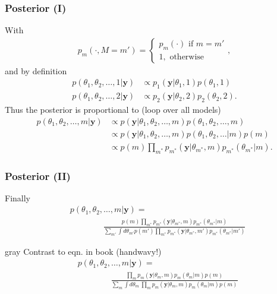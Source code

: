 \documentclass[usenames,dvipsnames,table]{beamer}
\begin{document}
\begin{frame}
\frametitle{Posterior (I)}

With
\begin{align*}
p_m(\cdot, M=m') =
    \begin{cases}
    p_m(\cdot) \text{ if } m = m' \\
    1, \text{ otherwise}
    \end{cases},
\end{align*}
and by definition
\begin{align*}
p(\theta_1, \theta_2, \ldots, 1|\mathbf{y})
    &\propto p_1(\mathbf{y}|\theta_1, 1)
             p(\theta_1, 1)
\\
p(\theta_1, \theta_2, \ldots, 2|\mathbf{y})
    &\propto p_2(\mathbf{y}|\theta_2, 2)
             p_2(\theta_2, 2)
.
\end{align*}
Thus the posterior is proportional to (loop over all models)
\begin{align*}
p(\theta_1, \theta_2, \ldots, m|\mathbf{y})
    &\propto p(\mathbf{y}|\theta_1, \theta_2, \ldots, m)
             p(\theta_1, \theta_2, \ldots, m)
\\
    &\propto p(\mathbf{y}|\theta_1, \theta_2, \ldots, m)
             p(\theta_1, \theta_2, \ldots| m)
             p(m)
\\
    &\propto p(m)
             \prod_{m^*} p_{m^*}(\mathbf{y}|\theta_{m^*}, m)
                         p_{m^*}(\theta_{m^*}| m).
\end{align*}

\end{frame}

\begin{frame}
\frametitle{Posterior (II)}

Finally
\begin{align*}
    & p(\theta_1, \theta_2, \ldots, m|\mathbf{y}) =
\\
    & \qquad\qquad
      \frac{p(m)
            \prod_{m^*} p_{m^*}(\mathbf{y}|\theta_{m^*}, m)
                        p_{m^*}(\theta_{m^*}| m)}
           {\sum_{m'} \int\! d\theta_{m'}
            p(m')
            \prod_{m^*} p_{m^*}(\mathbf{y}|\theta_{m^*}, m')
                        p_{m^*}(\theta_{m^*}| m')} \tag{10.2*}
\end{align*}

\vspace{3em}
\begin{color}{gray}
Contrast to eqn. in book (handwavy!)
\begin{align*}
    & p(\theta_1, \theta_2, \ldots, m|\mathbf{y}) =
\\
    & \qquad\qquad
      \frac{\prod_{m} p_m(\mathbf{y}|\theta_m, m)
                        p_{m}(\theta_m| m)p(m)}
           {\sum_m \int\! d\theta_m\
            \prod_m p_m(\mathbf{y}|\theta_m, m)
                        p_m(\theta_m| m)p(m)} \tag{10.2}
\end{align*}
\end{color}

\end{frame}
\end{document}
